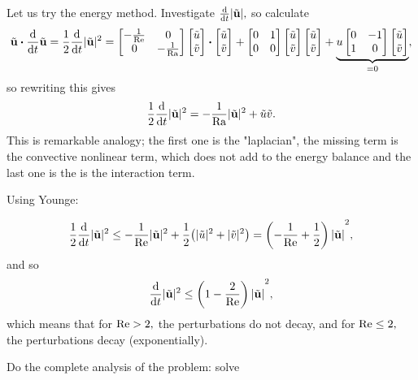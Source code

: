 \documentclass[reqno, a4paper]{article}
\begin{document}
Let us try the energy method. Investigate $\dv{t} |\tilde{\vb{u}}|, $ so calculate
\[
	\tilde{\vb{u}} \vdot \dv{t} \tilde{\vb{u}} = \frac{1}{2} \dv{t} |\tilde{\vb{u}}|^{2} = \begin{bmatrix}
		- \frac{1}{\Reynolds} & 0 \\
		0 & - \frac{1}{\Rayleigh}
	\end{bmatrix}
	\begin{bmatrix}
		\tilde{u} \\
		\tilde{v}
	\end{bmatrix}
	\vdot \begin{bmatrix}
		\tilde{u}\\
		\tilde{v}
	\end{bmatrix}
	+ \begin{bmatrix}
		0 & 1 \\
		0 & 0
	\end{bmatrix}
	\begin{bmatrix}
		\tilde{u} \\
		\tilde{v}
	\end{bmatrix}
	\begin{bmatrix}
		\tilde{u} \\
		\tilde{v}
	\end{bmatrix} + \underbrace{u\begin{bmatrix}
	0 & -1 \\
	1 & 0
	\end{bmatrix}
	\begin{bmatrix}
	  \tilde{u} \\
	  \tilde{v}
\end{bmatrix}}_{= 0},
\]
so rewriting this gives
\[
	\frac{1}{2}\dv{t} |\tilde{\vb{u}}|^{2} = - \frac{1}{\mathrm{Ra}}|\tilde{\vb{u}}|^{2}+ \tilde{u} \tilde{v}.
\]
This is remarkable analogy; the first one is the "laplacian", the missing term is the convective nonlinear term, which does not add to the energy balance and the last one is the is the interaction term.

Using Younge:

\[
	\frac{1}{2}\dv{t} |\tilde{\vb{u}}|^{2} \leq - \frac{1}{\mathrm{Re}}|\tilde{\vb{u}}|^{2} + \frac{1}{2}\qty(|\tilde{u}|^{2} + |\tilde{v}|^{2}) = \qty(- \frac{1}{\mathrm{Re}}+ \frac{1}{2})|\tilde{\vb{u}}|^{2},
\]
and so
\[
	\dv{t} |\tilde{\vb{u}}|^{2} \leq \qty(1-\frac{2}{\mathrm{Re}})|\tilde{\vb{u}}|^{2},
\]
which means that for $\mathrm{Re} > 2, $ the perturbations do not decay, and for $\mathrm{Re} \leq 2, $ the perturbations decay (exponentially). 

Do the complete analysis of the problem: solve
\end{document}
